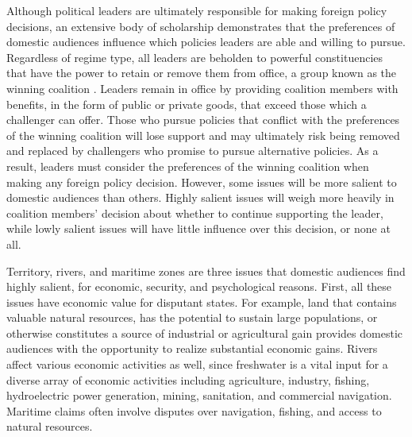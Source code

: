 \documentclass[../../dissertation.tex]{subfiles}
\begin{document}

Although political leaders are ultimately responsible for making foreign policy decisions, an extensive body of scholarship demonstrates that the preferences of domestic audiences influence which policies leaders are able and willing to pursue. Regardless of regime type, all leaders are beholden to powerful constituencies that have the power to retain or remove them from office, a group known as the winning coalition \citep{bdm2003}. Leaders remain in office by providing coalition members with benefits, in the form of public or private goods, that exceed those which a challenger can offer. Those who pursue policies that conflict with the preferences of the winning coalition will lose support and may ultimately risk being removed and replaced by challengers who promise to pursue alternative policies.
As a result, leaders must consider the preferences of the winning coalition when making any foreign policy decision. However, some issues will be more salient to domestic audiences than others. Highly salient issues will weigh more heavily in coalition members' decision about whether to continue supporting the leader, while lowly salient issues will have little influence over this decision, or none at all.


Territory, rivers, and maritime zones are three issues that domestic audiences find highly salient, for economic, security, and psychological reasons. First, all these issues have economic value for disputant states. For example, land that contains valuable natural resources, has the potential to sustain large populations, or otherwise constitutes a source of industrial or agricultural gain provides domestic audiences with the opportunity to realize substantial economic gains. Rivers affect various economic activities as well, since freshwater is a vital input for a diverse array of economic activities including agriculture, industry, fishing, hydroelectric power generation, mining, sanitation, and commercial navigation. Maritime claims often involve disputes over navigation, fishing, and access to natural resources.
\end{document}
